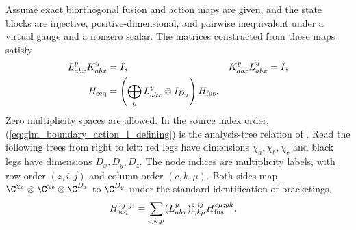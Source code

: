 \begin{lemma}
    \leanok
    \label{thm:glm_boundary_action_l_exists}
    Assume exact biorthogonal fusion and action maps are given, and the
    state blocks are injective, positive-dimensional, and pairwise
    inequivalent under a virtual gauge and a nonzero scalar. The matrices
    constructed from these maps satisfy
    \begin{align}
        L_{abx}^yK_{abx}^y & =I,                                                           & K_{abx}^yL_{abx}^y & =I, \\
        H_{\rm seq}        & =\left(\bigoplus_yL_{abx}^y\otimes I_{D_y}\right)H_{\rm fus}.
        \label{eq:glm_boundary_action_l_defining}
    \end{align}
    Zero multiplicity spaces are allowed. In the source index order,
    (\ref{eq:glm_boundary_action_l_defining}) is the analysis-tree relation
    of \cite[Section~3]{GarreRubio2023MPOSym}. Read the following trees from
    right to left: red legs have dimensions $\chi_a,\chi_b,\chi_c$ and
    black legs have dimensions $D_x,D_y,D_z$. The node indices are
    multiplicity labels, with row order $(z,i,j)$ and column order $(c,k,\mu)$.
    Both sides map $\C^{\chi_a}\otimes\C^{\chi_b}\otimes\C^{D_x}$ to
    $\C^{D_y}$ under the standard identification of bracketings.
    \begin{align}
        H_{\rm seq}^{zj;yi}
         & =\sum_{c,k,\mu}(L_{abx}^{y})_{c,k\mu}^{z,ij}
        H_{\rm fus}^{c\mu;yk}.
        \label{eq:glm_boundary_action_l_diagram}
    \end{align}
    \begin{tenkzequation}
        \ifdefined\ifplastex
            \def\tenkzeq{}
        \fi
        \begin{tenkzeq}

\end{tenkzeq}
\end{tenkzequation}
\end{lemma}
